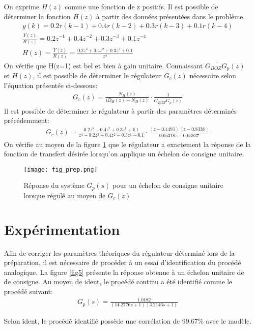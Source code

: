 On exprime $H(z)$ comme une fonction de z positifs. Il est possible de déterminer la fonction $H(z)$ à partir des données présentées dans le problème.
\begin{gather}
y(k) = 0.2r(k-1) + 0.4 r(k-2) + 0.3r(k-3) + 0.1r(k-4)\\
\frac{Y(z)}{R(z)} = 0.2z^{-1} + 0.4z^{-2} + 0.3z^{-3} + 0.1z^{-4}\\
H(z) = \frac{Y(z)}{R(z)} = \frac{0.2z^{3} + 0.4z^{2} + 0.3z^{1} + 0.1}{z^4}
\end{gather}
On vérifie que H(z=1) est bel et bien à gain unitaire.
Connaissant $\overline{G_{BOZ}G_p}(z)$ et $H(z)$, il est possible de déterminer le régulateur $G_c(z)$ nécessaire selon l'équation présentée ci-dessous:
\begin{gather}
G_c(z) = \frac{N_H(z)}{(D_H(z) - N_H(z)}\cdot \frac{1}{\overline{G_{BOZ}G_p}(z)}
\end{gather}
Il est possible de déterminer le régulateur à partir des paramètres déterminés précédemment:
\begin{gather}
G_c(z) = \frac{0.2z^{3} + 0.4z^{2} + 0.3z^{1} + 0.1}{z^4 - 0.2z^{3} - 0.4z^{2} - 0.3z^{1} - 0.1}\cdot \frac{(z-0.4493)(z-0.8338)}{0.05318z + 0.03837}
\end{gather}
On vérifie au moyen de la figure \ref{fig1} que le régulateur a exactement la réponse de la fonction de transfert désirée lorsqu'on applique un échelon de consigne unitaire.

\begin{figure}
\centering
\texttt{[image: fig\_prep.png]}
\caption{Réponse du système $G_p(s)$ pour un échelon de consigne unitaire lorsque régulé au moyen de $G_c(z)$}
\label{fig1}
\end{figure}
\section{Expérimentation}
Afin de corriger les paramètres théoriques du régulateur déterminé lors de la préparation, il est nécessaire de procéder à un essai d'identification du procédé analogique. La figure \ref{fig5} présente la réponse obtenue à un échelon unitaire de de consigne. Au moyen de ident, le procédé continu a été identifié comme le procédé suivant:
\begin{gather}
G_p(s) = \frac{1.0182}{(14.2776s +1)(3.2146s + 1)}
\end{gather}

Selon ident, le procédé identifié possède une corrélation de 99.67\% avec le modèle.

